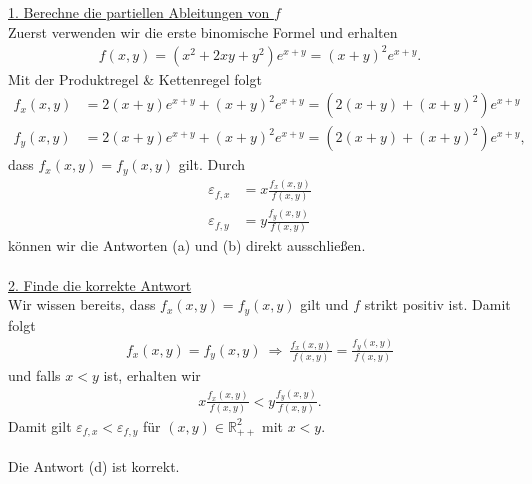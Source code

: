\underline{1. Berechne die partiellen Ableitungen von $ f $}\\
Zuerst verwenden wir die erste binomische Formel und erhalten 
\begin{align*}
f(x,y) = (x^2 + 2xy + y^2) e^{x+y} = (x+ y)^2 e^{x+y}.
\end{align*}
Mit der Produktregel \& Kettenregel folgt 
\begin{align*}
f_x(x,y)
&= 2(x + y) e^{x+y} + (x+y)^2 e^{x+y}
= (2(x+y) +(x+y)^2) e^{x+y}\\
f_y(x,y) &= 2(x + y) e^{x+y} + (x+y)^2 e^{x+y} = (2(x+y) +(x+y)^2) e^{x+y},
\end{align*}
dass $ f_x(x,y) = f_y(x,y) $ gilt. Durch
\begin{align*}
\varepsilon_{f,x} &= x \frac{f_x(x,y)}{f(x,y)}\\
\varepsilon_{f,y} &= y \frac{f_y(x,y)}{f(x,y)}
\end{align*}
können wir die Antworten (a) und (b) direkt ausschließen.
\\
\\
\underline{2. Finde die korrekte Antwort}\\
Wir wissen bereits, dass $ f_x(x,y) = f_y(x,y) $ gilt und $ f $ strikt positiv ist. Damit folgt 
\begin{align*}
f_x(x,y) = f_y(x,y) \ \Rightarrow \
\frac{f_x(x,y)}{f(x,y)} = \frac{f_y(x,y)}{f(x,y)}
\end{align*}
und falls $ x < y $ ist, erhalten wir
\begin{align*}
x \frac{f_x(x,y)}{f(x,y)} < y\frac{f_y(x,y)}{f(x,y)}.
\end{align*}
Damit gilt $ \varepsilon_{f,x} < \varepsilon_{f,y}  $ für $ (x,y) \in \mathbb{R}^2_{++} $ mit $ x < y $.\\
\\
Die Antwort (d) ist korrekt.
\newpage

\subsection*{}

